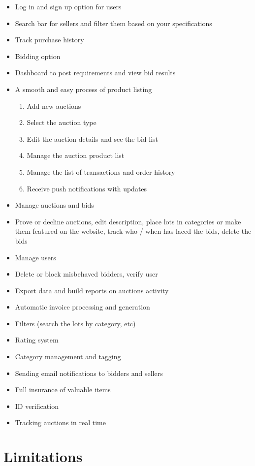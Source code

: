 \documentclass{report}
\begin{document}
\begin{itemize}
\item  Log in and sign up option for users
\item  Search bar for sellers and filter them based on your specifications
\item  Track purchase history
\item  Bidding option
\item  Dashboard to post requirements and view bid results
\item  A smooth and easy process of product listing
\begin{enumerate}
\item Add new auctions 
\item  Select the auction type
\item  Edit the auction details and see the bid list
\item Manage the auction product list
\item Manage the list of transactions and order history
\item Receive push notifications with updates
\end{enumerate}
\item   Manage auctions and bids
\item  Prove or decline auctions, edit description, place lots in categories  or make them featured on the website, track who / when has laced the bids, delete the bids
\item  Manage users
\item  Delete or block misbehaved bidders, verify user
\item  Export data and build reports on auctions activity
\item  Automatic invoice processing and generation
\item  Filters (search the lots by category, etc)
\item  Rating system
\item  Category management and tagging
\item  Sending email notifications to bidders and sellers
\item  Full insurance of valuable items
\item  ID verification
\item  Tracking auctions in real time
\end{itemize}


\section*{Limitations}
\end{document}
